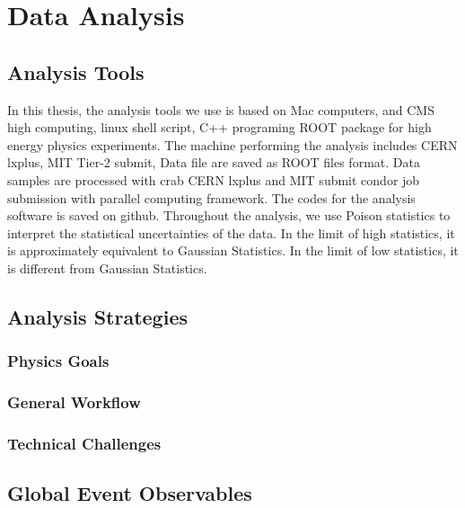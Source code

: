 \chapter{Data Analysis}

\section{Analysis Tools}

In this thesis, the analysis tools we use is based on Mac computers, and CMS high computing, linux shell script, C++ programing ROOT package for high energy physics experiments. The machine performing the analysis includes CERN lxplus, MIT Tier-2 submit, Data file are saved as ROOT files format. Data samples are processed with crab CERN lxplus and MIT submit condor job submission with parallel computing framework. The codes for the analysis software is saved on github. Throughout the analysis, we use Poison statistics to interpret the statistical uncertainties of the data. In the limit of high statistics, it is approximately equivalent to Gaussian Statistics. In the limit of low statistics, it is different from Gaussian Statistics.

\section{Analysis Strategies}

\subsection{Physics Goals}

\subsection{General Workflow}

\subsection{Technical Challenges}

\section{Global Event Observables} 

